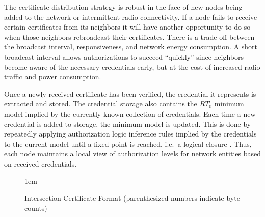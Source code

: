 The certificate distribution strategy is robust in the face of new
nodes being added to the network or intermittent radio
connectivity. If a node fails to receive certain certificates from its
neighbors it will have another opportunity to do so when those
neighbors rebroadcast their certificates. There is a trade off between
the broadcast interval, responsiveness, and network energy
consumption. A short broadcast interval allows authorizations to
succeed ``quickly'' since neighbors become aware of the necessary
credentials early, but at the cost of increased radio traffic and
power consumption.

Once a newly received certificate has been verified, the credential it
represents is extracted and stored. The credential storage also
contains the $RT_0$ minimum model implied by the currently known
collection of credentials. Each time a new credential is added to
storage, the minimum model is updated. This is done by repeatedly
applying authorization logic inference rules implied by the
credentials to the current model until a fixed point is reached,
i.e.~a logical closure \cite{Li:DCFTML}. Thus, each node maintains a
local view of authorization levels for network entities based on
received credentials.

\begin{figure}[t]
  
  \centerline{\raise 1em\box\graph}
  \vspace{2mm}
  \caption{Intersection Certificate Format (parenthesized numbers indicate byte counts)}
  \label{figure-certformats}
\end{figure}

